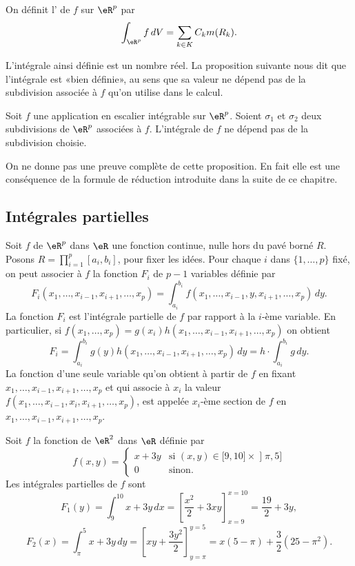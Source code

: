 \begin{definition} 
On définit l' de $f$ sur $\eR^p$ par
\[
\int_{\eR^p}f\,dV=\sum_{k\in K}C_km(R_k).
\] 
\end{definition}
L'intégrale ainsi définie est un nombre réel. La proposition suivante nous dit que l'intégrale est «bien définie», au sens que sa valeur ne dépend pas de la subdivision associée à $f$ qu'on utilise dans le calcul. 
\begin{proposition}
Soit $f$ une application en escalier intégrable sur $\eR^p$. Soient $\sigma_1$ et $\sigma_2$ deux subdivisions de $\eR^p$ associées à  $f$. L'intégrale de $f$ ne dépend pas de la subdivision choisie.
\end{proposition}
On ne donne pas une preuve complète de cette proposition. En fait elle est une conséquence de la formule de réduction introduite dans la suite de ce chapitre.  


\subsection{Intégrales partielles}
Soit $f$ de $\eR^p$ dans $\eR$ une fonction continue, nulle hors du pavé borné $R$. Posons  $R=\prod_{i=1}^{p}[a_i,b_i]$, pour fixer les idées. Pour chaque $i$ dans $\{1,\ldots, p\}$ fixé, on peut associer à $f$ la fonction $F_i$ de $p-1$ variables définie par
\[
F_i(x_1,\ldots, x_{i-1}, x_{i+1}, \ldots, x_p)=\int_{a_i}^{b_i}f(x_1,\ldots, x_{i-1},y, x_{i+1}, \ldots, x_p)\, dy.
\]  
La fonction $F_i$ est l'intégrale partielle de $f$ par rapport à la $i$-ème variable. 
En particulier, si $f(x_1,\ldots, x_p)=g(x_i)h(x_1,\ldots, x_{i-1}, x_{i+1}, \ldots, x_p)$ on obtient 
\[
F_i=\int_{a_i}^{b_i}g(y)h(x_1,\ldots, x_{i-1}, x_{i+1}, \ldots, x_p)\, dy= h\cdot\int_{a_i}^{b_i}g \, dy.
\]  
La fonction d'une seule variable qu'on obtient à partir de $f$ en fixant $x_1,\ldots, x_{i-1}, x_{i+1}, \ldots, x_p$ et qui associe à $x_i$ la valeur $f(x_1,\ldots, x_{i-1}, x_i, x_{i+1}, \ldots, x_p)$, est appelée $x_i$-ème section de $f$ en $x_1,\ldots, x_{i-1}, x_{i+1}, \ldots, x_p$. 
\begin{example}
  Soit $f$ la fonction de $\eR^2$ dans $\eR$ définie par 
  \begin{equation}
	  f(x,y)=\begin{cases}
		  x+3y	&	\text{si $(x,y)\in\mathopen[ 9 , 10 \mathclose]\times\mathopen] \pi , 5 \mathclose]$}\\
		  0	&	 \text{sinon}.
	  \end{cases}
  \end{equation}
 Les intégrales partielles de $f$ sont 
\[
F_1(y)=\int_{9}^{10}x+3y\,dx=\left[\frac{x^2}{2}+3xy\right]_{x=9}^{x=10}=\frac{19}{2}+3y,
\]
\[
F_2(x)=\int_{\pi}^{5}x+3y\,dy=\left[xy+\frac{3y^2}{2}\right]_{y=\pi}^{y=5}=x(5-\pi)+\frac{3}{2}(25-\pi^2).
\]
\end{example}
